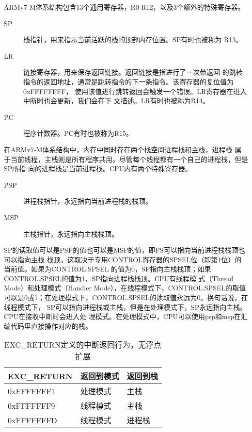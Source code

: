 ARMv7-M体系结构包含13个通用寄存器，R0-R12，以及3个额外的特殊寄存器。

\begin{description}
	\item[SP] 栈指针，用来指示当前活跃的栈的顶部内存位置。SP有时也被称为
	R13。
	\item[LR] 链接寄存器，用来保存返回链接。返回链接是指进行了一次带返回
	的跳转指令的返回地址，通常是跳转指令的下一条指令。该寄存器的复位值为0xFFFFFFFF，
	使用该值进行跳转返回会触发一个错误。LR寄存器在进入中断时也会更新，我们会在下
	文描述。LR有时也被称为R14。
	\item[PC] 程序计数器。PC有时也被称为R15。
\end{description}

在ARMv7-M体系结构中，内存中同时存在两个栈空间\pozhehao 进程栈和主栈，进程栈
属于当前线程，主栈则是所有程序共用。尽管每个线程都有一个自己的进程栈，但是SP所指
向的进程栈是当前进程栈。CPU内有两个特殊寄存器。

\begin{description}
	\item[PSP] 进程栈指针，永远指向当前进程栈的栈顶。
	\item[MSP] 主栈指针，永远指向主栈栈顶。
\end{description}

SP的读取值可以是PSP的值也可以是MSP的值，即PS可以指向当前进程栈栈顶也可以指向主栈
栈顶，这取决于专用CONTROL寄存器的SPSEL位（即第1位）的当前值。如果为CONTROL.SPSEL
的值为0，SP指向主栈栈顶；如果CONTROL.SPSEL的值为1，SP指向进程栈栈顶。CPU有线程模
式（Thread Mode）和处理模式（Handler Mode），在线程模式下，CONTROL.SPSEL的取值
可以是0或1；在处理模式下，CONTROL.SPSEL的读取值永远为0。换句话说，在线程模式下，
SP可以指向进程栈或主栈，但是在处理模式下，SP永远指向主栈。CPU在接收中断时会进入处
理模式。在处理模式中，CPU可以使用psp和msp在汇编代码里直接操作对应的栈。

\begin{table}[htb]
	\centering
	\caption{EXC\_RETURN定义的中断返回行为，无浮点扩展}
	\label{tab:exe_return_noFP}
	\begin{tabularx}{\linewidth}{XXX}
		\toprule[1.5pt]
		{\heiti EXC\_RETURN} & {\heiti 返回到模式} & {\heiti 返回到栈}\\
		\midrule[1pt]
		0xFFFFFFF1 & 处理模式 & 主栈 \\
		\midrule[0.5pt]
		0xFFFFFFF9 & 线程模式 & 主栈 \\
		\midrule[0.5pt]
		0xFFFFFFFD & 线程模式 & 进程栈 \\
		\bottomrule[1.5pt]
	\end{tabularx}
\end{table}

